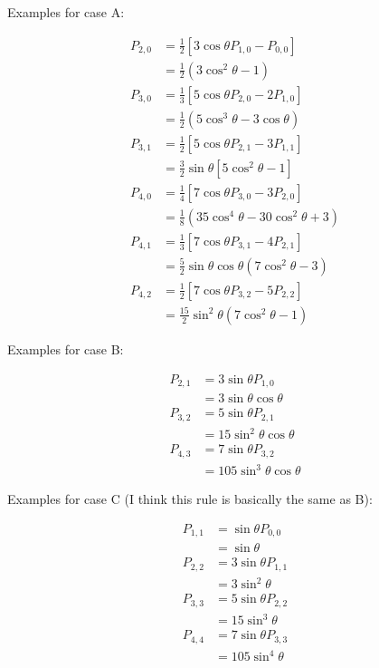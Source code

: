 \documentclass[]{article}
\begin{document}
		Examples for case A:
		
		\begin{align}
			P_{2,0} &= \frac{1}{2}\left[ 3\cos{\theta} P_{1,0} - P_{0,0} \right] \\
					&= \frac{1}{2}(3\cos^2{\theta} - 1) \\
			P_{3,0} &= \frac{1}{3}\left[5\cos{\theta}P_{2,0} - 2P_{1,0}\right] \\
					&= \frac{1}{2}(5 \cos^3{\theta} - 3\cos{\theta}) \\
			P_{3,1} &= \frac{1}{2}\left[5 \cos{\theta} P_{2,1} - 3P_{1,1}\right] \\
					&= \frac{3}{2}\sin{\theta}\left[5 \cos^2{\theta} - 1\right] \\
			P_{4,0} &= \frac{1}{4}\left[7\cos{\theta}P_{3,0} - 3P_{2,0}\right] \\
					&= \frac{1}{8}(35 \cos^4{\theta} - 30\cos^2{\theta} + 3) \\
			P_{4,1} &= \frac{1}{3}\left[7\cos{\theta} P_{3,1} - 4P_{2,1}\right] \\
					&= \frac{5}{2}\sin{\theta}\cos{\theta}(7\cos^2{\theta} - 3) \\
			P_{4,2} &= \frac{1}{2}\left[7\cos{\theta}P_{3,2} - 5P_{2,2}\right] \\
					&= \frac{15}{2}\sin^2{\theta}(7\cos^2{\theta} -1)
		\end{align}
		
		Examples for case B:
		
		\begin{align}
			P_{2,1} &= 3\sin{\theta}P_{1,0} \\
					&= 3\sin{\theta}\cos{\theta} \\
			P_{3,2} &= 5\sin{\theta}P_{2,1} \\
					&= 15\sin^2{\theta}\cos{\theta} \\
			P_{4,3} &= 7\sin{\theta}P_{3,2} \\
					&= 105\sin^3{\theta}\cos{\theta} 
		\end{align}
		
		Examples for case C (I think this rule is basically the same as B):
		
		\begin{align}
			P_{1,1} &= \sin{\theta}P_{0,0} \\
					&= \sin{\theta} \\
			P_{2,2} &= 3\sin{\theta}P_{1,1} \\
					&= 3\sin^2{\theta} \\
			P_{3,3} &= 5\sin{\theta}P_{2,2} \\
					&= 15\sin^3{\theta} \\
			P_{4,4} &= 7\sin{\theta}P_{3,3} \\
					&= 105\sin^4{\theta}
		\end{align}
		
\end{document}
